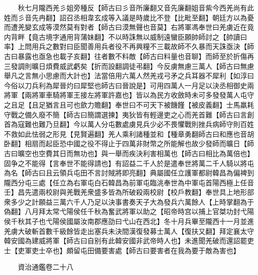 　　秋七月隴西羌彡姐旁種反【師古曰彡音所廉翻又音先廉翻姐音紫今西羌尚有此姓而彡音先冉翻】詔召丞相韋玄成等入議是時歲比不登【比毗至翻】朝廷方以為憂而遭羌變玄成等漠然莫有對者【師古曰漠無聲也音莫】右將軍馮奉世曰羌虜近在竟内背畔【竟古境字通用背蒲妹翻】不以時誅無以威制遠蠻臣願帥師討之【帥讀曰率】上問用兵之數對曰臣聞善用兵者役不再興糧不三載故師不久暴而天誅亟決【師古曰暴露也亟急也載子亥翻】往者數不料敵【師古曰料量也音聊】而師至於折傷再三發調則曠日煩費威武虧矣【折而設翻調徒弔翻】今反虜無慮三萬人【師古曰無慮舉凡之言無小思慮而大計也】法當倍用六萬人然羌戎弓矛之兵耳器不犀利【如淳曰今俗以刀兵利為犀晉灼曰犀堅也師古曰晉說是】可用四萬人一月足以決丞相御史兩將軍【兩將軍車騎將軍王接左將軍許嘉也】皆以為民方收斂時未可多發發萬人屯守之且足【且足猶言且可也歛力贍翻】奉世曰不可天下被饑饉【被皮義翻】士馬羸耗守戰之備久廢不簡【師古曰簡謂選揀】夷狄皆有輕邊吏之心而羌首難【師古曰言創首為寇難也難乃旦翻】今以萬人分屯數處虜見兵少必不畏懼戰則挫兵病師守則百姓不救如此怯弱之形見【見賢遍翻】羌人乘利諸種並和【種章勇翻師古曰和應也音胡卧翻】相扇而起臣恐中國之役不得止于四萬非財幣之所能解也故少發師而曠日【師古曰曠空也空費其日而無功也】與一舉而疾決利害相萬也【師古曰相比為萬倍也】固争之不能得【言奉世不能得請也】有詔益二千人於是遣奉世將萬二千人騎以將屯為名【師古曰且云領兵屯田不言討賊將即亮翻】典屬國任立護軍都尉韓昌為偏裨到隴西分屯三處【任立為右軍屯白石韓昌為前軍屯臨洮奉世為中軍屯首陽西極上任音壬】昌先遣兩校尉與羌戰羌衆盛多皆為所破殺兩校尉【校戶教翻】奉世具上地形部衆多少之計願益三萬六千人乃足以決事書奏天子大為發兵六萬餘人【上時掌翻為于偽翻】八月拜太常弋陽侯任千秋為奮武將軍以助之【昭帝時宫以捕上官桀功封弋陽侯千秋其子也弋陽侯國屬汝南郡應劭曰弋山在西北】冬十月兵畢至隴西十一月並進羌虜大破斬首數千級餘皆走出塞兵未決間漢復發募士萬人【復扶又翻】拜定襄太守韓安國為建威將軍【師古曰自别有此韓安國非武帝時人也】未進聞羌破而還詔罷吏士【吏軍吏士卒也】頗留屯田備要害處【師古曰要害者在我為要于敵為害也】

　　資治通鑑卷二十八  
    


 


 



 

 
  







 


　　
　　
　
　
　


　　

　















